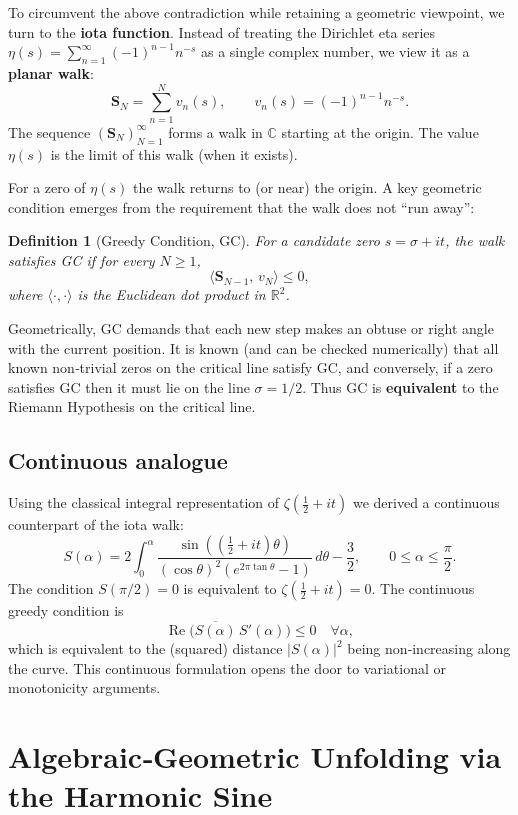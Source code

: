 \documentclass[11pt,a4paper]{article}
\newtheorem{definition}[theorem]{Definition}
\newcommand{\R}{\mathbb{R}}
\newcommand{\RE}{\operatorname{Re}}
\begin{document}
To circumvent the above contradiction while retaining a geometric viewpoint, we turn to the \textbf{iota function}.  Instead of treating the Dirichlet eta series \(\eta(s)=\sum_{n=1}^\infty (-1)^{n-1}n^{-s}\) as a single complex number, we view it as a \textbf{planar walk}:
\[
\mathbf{S}_N = \sum_{n=1}^N v_n(s),\qquad v_n(s)=(-1)^{n-1}n^{-s}.
\]
The sequence \((\mathbf{S}_N)_{N=1}^\infty\) forms a walk in \(\mathbb C\) starting at the origin.  The value \(\eta(s)\) is the limit of this walk (when it exists).

For a zero of \(\eta(s)\) the walk returns to (or near) the origin.  A key geometric condition emerges from the requirement that the walk does not “run away”:
\begin{definition}[Greedy Condition, GC]
For a candidate zero \(s=\sigma+it\), the walk satisfies GC if for every \(N\ge 1\),
\[
\langle \mathbf{S}_{N-1},\, v_N\rangle \le 0,
\]
where \(\langle\cdot,\cdot\rangle\) is the Euclidean dot product in \(\R^2\).
\end{definition}
Geometrically, GC demands that each new step makes an obtuse or right angle with the current position.  It is known (and can be checked numerically) that all known non‑trivial zeros on the critical line satisfy GC, and conversely, if a zero satisfies GC then it must lie on the line \(\sigma=1/2\).  Thus GC is \textbf{equivalent} to the Riemann Hypothesis on the critical line.

\subsection{Continuous analogue}
Using the classical integral representation of \(\zeta(\frac12+it)\) we derived a continuous counterpart of the iota walk:
\[
S(\alpha)=2\int_0^\alpha \frac{\sin((\frac12+it)\theta)}{(\cos\theta)^2(e^{2\pi\tan\theta}-1)}\,d\theta -\frac32,
\qquad 0\le\alpha\le\frac\pi2.
\]
The condition \(S(\pi/2)=0\) is equivalent to \(\zeta(\frac12+it)=0\).  The continuous greedy condition is
\[
\RE\!\bigl( \overline{S(\alpha)}\, S'(\alpha) \bigr) \le 0\quad \forall\alpha,
\]
which is equivalent to the (squared) distance \(|S(\alpha)|^2\) being non‑increasing along the curve.  This continuous formulation opens the door to variational or monotonicity arguments.

\section{Algebraic‑Geometric Unfolding via the Harmonic Sine}
\label{sec:harmonic-sine}
\end{document}
